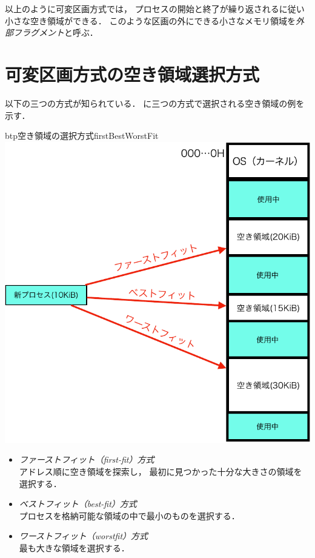 以上のように可変区画方式では，
プロセスの開始と終了が繰り返されるに従い小さな空き領域ができる．
このような区画の外にできる小さなメモリ領域を\emph{外部フラグメント}と呼ぶ．

\section{可変区画方式の空き領域選択方式}
以下の三つの方式が知られている．
に三つの方式で選択される空き領域の例を示す．

\begin{myfig}{btp}{空き領域の選択方式}{firstBestWorstFit}
  \includegraphics[scale=0.6]{Fig/firstBestWorstFit-crop.pdf}
\end{myfig}

\begin{itemize}
\item \emph{ファーストフィット（first-fit）方式}\\
  アドレス順に空き領域を探索し，
  最初に見つかった十分な大きさの領域を選択する．
\item \emph{ベストフィット（best-fit）方式}\\
  プロセスを格納可能な領域の中で最小のものを選択する．
\item \emph{ワーストフィット（worstfit）方式}\\
  最も大きな領域を選択する．
\end{itemize}

